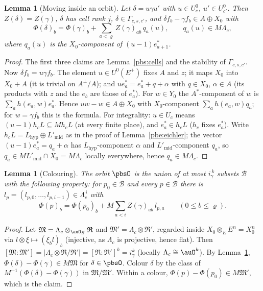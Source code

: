 \documentclass[10pt]{amsart}
\newtheorem{lemma}[theorem]{Lemma}
\theoremstyle{definition}
\theoremstyle{remark}
\begin{document}
\begin{lemma}[Moving inside an orbit]\label{pbs:move}
Let $\delta=u\gamma u'$ with $u\in U^0_c$, $u'\in U^0_{c'}$. Then $Z(\delta)=Z(\gamma)$, $\delta$ has cell
rank $j$, $\delta\in\Gamma_{c,s,c'}$, and $\delta f_b-\gamma f_b\in A\oplus X_0$ with
\[
\Phi(\delta)_b=\Phi(\gamma)_b+\sum_{a<\varrho}Z(\gamma)_{ab}\,q_a(u),\qquad q_a(u)\in M\Lambda_c,
\]
where $q_a(u)$ is the $X_0$-component of $(u-1)e^*_{a+1}$.
\end{lemma}
\begin{proof}
The first three claims are Lemma~\ref{pbs:cells} and the stability of $\Gamma_{c,s,c'}$. Now $\delta f_b
=u\gamma f_b$. The element $u\in U^0(E^+)$ fixes $A$ and $z$; it maps $X_0$ into $X_0+A$ (it is trivial
on $A^\perp/A$); and $ue^*_a=e^*_a+q+\alpha$ with $q\in X_0$, $\alpha\in A$ (its products with $z$ and the
$e_b$ are those of $e^*_a$). For $w\in Y_0$ the $A^*$-component of $w$ is $\sum_ah(e_a,w)e^*_a$. Hence
$uw-w\in A\oplus X_0$ with $X_0$-component $\sum_ah(e_a,w)q_a$; for $w=\gamma f_b$ this is the formula.
For integrality: $u\in U_c$ means $(u-1)h_cL\subseteq Mh_cL$ (at every finite place), and $e^*_a\in h_cL$
($h_c$ fixes $e^*_a$). Write $h_cL=L_{\mathrm{hyp}}\oplus L'_{\mathrm{mid}}$ as in the proof of
Lemma~\ref{pbe:eichler}; the vector $(u-1)e^*_a=q_a+\alpha$ has $L_{\mathrm{hyp}}$-component $\alpha$ and
$L'_{\mathrm{mid}}$-component $q_a$, so $q_a\in ML'_{\mathrm{mid}}\cap X_0=M\Lambda_c$ locally everywhere,
hence $q_a\in M\Lambda_c$.
\end{proof}

\begin{lemma}[Colouring]\label{pbs:colour}
The orbit $\pbsO$ is the union of at most $i_\gamma^{\,k}$ subsets $\mathcal B$ with the following
property: for $p_0\in\mathcal B$ and every $p\in\mathcal B$ there is $l_p=(l_{p,0},\dots,l_{p,i-1})\in
\Lambda_c^{\,i}$ with
\[
\Phi(p)_b=\Phi(p_0)_b+M\sum_{a<i}Z(\gamma)_{ab}\,l_{p,a}\qquad(0\le b\le\varrho).
\]
\end{lemma}
\begin{proof}
Let $\mathfrak M=\Lambda_c\otimes_{\auO_E}\mathfrak R$ and $\mathfrak M'=\Lambda_c\otimes\mathfrak R'$,
regarded inside $X_0\otimes_EE^n=X_0^n$ via $l\otimes\xi\mapsto(\xi_bl)_b$ (injective, as $\Lambda_c$ is
projective, hence flat). Then $[\mathfrak M:\mathfrak M']=|\Lambda_c\otimes\mathfrak R/\mathfrak R'|=
[\mathfrak R:\mathfrak R']^k=i_\gamma^k$ (locally $\Lambda_c\cong\auO^k$). By Lemma~\ref{pbs:move},
$\Phi(\delta)-\Phi(\gamma)\in M\mathfrak M$ for $\delta\in\pbsO$. Colour $\delta$ by the class of $M^{-1}
(\Phi(\delta)-\Phi(\gamma))$ in $\mathfrak M/\mathfrak M'$. Within a colour, $\Phi(p)-\Phi(p_0)\in
M\mathfrak M'$, which is the claim.
\end{proof}
\end{document}
